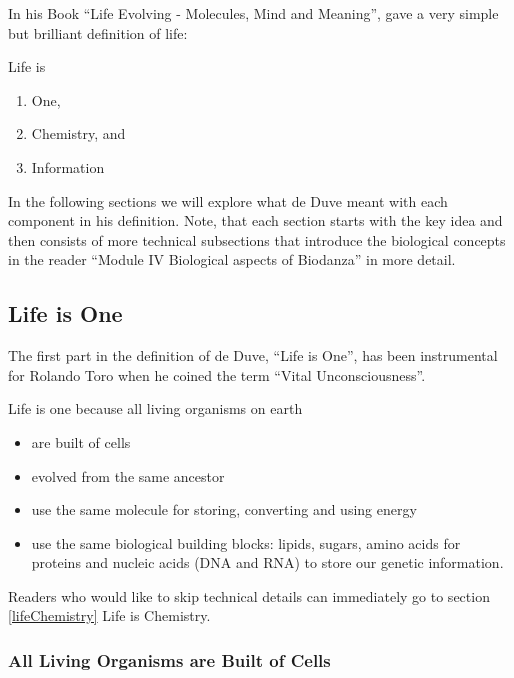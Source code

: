 \documentclass[
  11pt,
]{book}
\providecommand{\tightlist}{%
  \setlength{\itemsep}{0pt}\setlength{\parskip}{0pt}}
\begin{document}
In his Book ``Life Evolving - Molecules, Mind and Meaning'', \citet{deDuve2002} gave a very simple but brilliant definition of life:

Life is

\begin{enumerate}
\def\labelenumi{\arabic{enumi}.}
\tightlist
\item
  One,
\item
  Chemistry, and
\item
  Information
\end{enumerate}

In the following sections we will explore what de Duve meant with each component in his definition. Note, that each section starts with the key idea and then consists of more technical subsections that introduce the biological concepts in the reader ``Module IV Biological aspects of Biodanza'' in more detail.

\hypertarget{lifeOne}{%
\subsection{Life is One}\label{lifeOne}}

The first part in the definition of de Duve, ``Life is One'', has been instrumental for Rolando Toro when he coined the term ``Vital Unconsciousness''.

Life is one because all living organisms on earth

\begin{itemize}
\tightlist
\item
  are built of cells
\item
  evolved from the same ancestor
\item
  use the same molecule for storing, converting and using energy
\item
  use the same biological building blocks: lipids, sugars, amino acids for proteins and nucleic acids (DNA and RNA) to store our genetic information.
\end{itemize}

Readers who would like to skip technical details can immediately go to section \ref{lifeChemistry} Life is Chemistry.

\hypertarget{all-living-organisms-are-built-of-cells}{%
\subsubsection{All Living Organisms are Built of Cells}\label{all-living-organisms-are-built-of-cells}}
\end{document}
